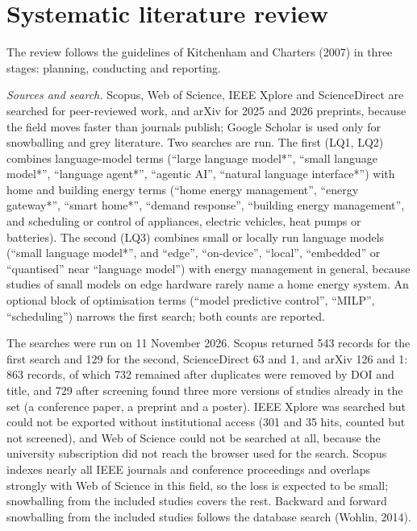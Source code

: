 \documentclass[12pt,a4paper]{report}
\begin{document}
\section{Systematic literature review}
\label{sec:slr}

The review follows the guidelines of Kitchenham and Charters (2007) in three
stages: planning, conducting and reporting.

\textit{Sources and search.} Scopus, Web of Science, IEEE Xplore and
ScienceDirect are searched for peer-reviewed work, and arXiv for 2025
and 2026 preprints, because the field moves faster than journals
publish; Google Scholar is used only for snowballing and grey
literature. Two searches are run. The first (LQ1, LQ2) combines
language-model terms (``large language model*'', ``small language
model*'', ``language agent*'', ``agentic AI'', ``natural language
interface*'') with home and building energy terms (``home energy
management'', ``energy gateway*'', ``smart home*'', ``demand response'',
``building energy management'', and scheduling or control of
appliances, electric vehicles, heat pumps or batteries). The second
(LQ3) combines small or locally run language models (``small language
model*'', and ``edge'', ``on-device'', ``local'', ``embedded'' or
``quantised'' near ``language model'') with energy management in
general, because studies of small models on edge hardware rarely name a
home energy system. An optional block of optimisation terms (``model
predictive control'', ``MILP'', ``scheduling'') narrows the first search;
both counts are reported.

The searches were run on 11 November 2026. Scopus returned 543
records for the first search and 129 for the second, ScienceDirect 63
and 1, and arXiv 126 and 1: 863 records, of which 732 remained after
duplicates were removed by DOI and title, and 729 after screening found
three more versions of studies already in the set (a conference paper,
a preprint and a poster). IEEE Xplore was searched but
could not be exported without institutional access (301 and 35 hits,
counted but not screened), and Web of Science could not be searched at
all, because the university subscription did not reach the browser used
for the search. Scopus indexes nearly all IEEE journals and conference
proceedings and overlaps strongly with Web of Science in this field, so
the loss is expected to be small; snowballing from the included studies
covers the rest. Backward and forward snowballing from the included
studies follows the database search (Wohlin, 2014).
\end{document}
